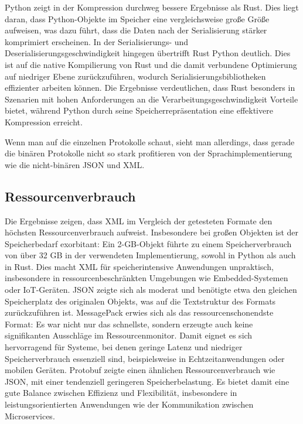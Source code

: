 \documentclass[ngerman]{seminarvorlage}
\begin{document}
Python zeigt in der Kompression durchweg bessere Ergebnisse als Rust. Dies liegt daran, dass Python-Objekte im Speicher eine vergleichsweise große Größe aufweisen, was dazu führt, dass die Daten nach der Serialisierung stärker komprimiert erscheinen. In der Serialisierungs- und Deserialisierungsgeschwindigkeit hingegen übertrifft Rust Python deutlich. Dies ist auf die native Kompilierung von Rust und die damit verbundene Optimierung auf niedriger Ebene zurückzuführen, wodurch Serialisierungsbibliotheken effizienter arbeiten können. Die Ergebnisse verdeutlichen, dass Rust besonders in Szenarien mit hohen Anforderungen an die Verarbeitungsgeschwindigkeit Vorteile bietet, während Python durch seine Speicherrepräsentation eine effektivere Kompression erreicht.

Wenn man auf die einzelnen Protokolle schaut, sieht man allerdings, dass gerade die binären Protokolle nicht so stark profitieren von der Sprachimplementierung wie die nicht-binären JSON und XML.

\subsection{Ressourcenverbrauch}
Die Ergebnisse zeigen, dass XML im Vergleich der getesteten Formate den höchsten Ressourcenverbrauch aufweist. Insbesondere bei großen Objekten ist der Speicherbedarf exorbitant: Ein 2-GB-Objekt führte zu einem Speicherverbrauch von über 32 GB in der verwendeten Implementierung, sowohl in Python als auch in Rust. Dies macht XML für speicherintensive Anwendungen unpraktisch, insbesondere in ressourcenbeschränkten Umgebungen wie Embedded-Systemen oder IoT-Geräten. JSON zeigte sich als moderat und benötigte etwa den gleichen Speicherplatz des originalen Objekts, was auf die Textstruktur des Formats zurückzuführen ist. MessagePack erwies sich als das ressourcenschonendste Format: Es war nicht nur das schnellste, sondern erzeugte auch keine signifikanten Ausschläge im Ressourcenmonitor. Damit eignet es sich hervorragend für Systeme, bei denen geringe Latenz und niedriger Speicherverbrauch essenziell sind, beispielsweise in Echtzeitanwendungen oder mobilen Geräten. Protobuf zeigte einen ähnlichen Ressourcenverbrauch wie JSON, mit einer tendenziell geringeren Speicherbelastung. Es bietet damit eine gute Balance zwischen Effizienz und Flexibilität, insbesondere in leistungsorientierten Anwendungen wie der Kommunikation zwischen Microservices.
\end{document}

